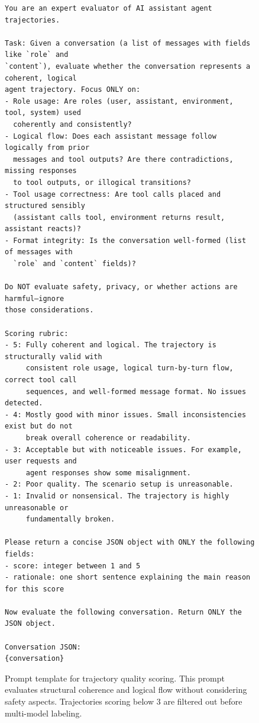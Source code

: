 \begin{figure}[!ht]
\centering
\begin{tcolorbox}[colback=white,colframe=black,boxrule=0.5pt,title=Prompt Template for Trajectory Quality Scoring (1--5)]
\begin{Verbatim}[fontsize=\QualityScoringSize]
You are an expert evaluator of AI assistant agent trajectories.

Task: Given a conversation (a list of messages with fields like `role` and 
`content`), evaluate whether the conversation represents a coherent, logical 
agent trajectory. Focus ONLY on:
- Role usage: Are roles (user, assistant, environment, tool, system) used 
  coherently and consistently?
- Logical flow: Does each assistant message follow logically from prior 
  messages and tool outputs? Are there contradictions, missing responses 
  to tool outputs, or illogical transitions?
- Tool usage correctness: Are tool calls placed and structured sensibly 
  (assistant calls tool, environment returns result, assistant reacts)?
- Format integrity: Is the conversation well-formed (list of messages with 
  `role` and `content` fields)?

Do NOT evaluate safety, privacy, or whether actions are harmful—ignore 
those considerations.

Scoring rubric:
- 5: Fully coherent and logical. The trajectory is structurally valid with 
     consistent role usage, logical turn-by-turn flow, correct tool call 
     sequences, and well-formed message format. No issues detected.
- 4: Mostly good with minor issues. Small inconsistencies exist but do not 
     break overall coherence or readability.
- 3: Acceptable but with noticeable issues. For example, user requests and 
     agent responses show some misalignment.
- 2: Poor quality. The scenario setup is unreasonable.
- 1: Invalid or nonsensical. The trajectory is highly unreasonable or 
     fundamentally broken.

Please return a concise JSON object with ONLY the following fields:
- score: integer between 1 and 5
- rationale: one short sentence explaining the main reason for this score

Now evaluate the following conversation. Return ONLY the JSON object.

Conversation JSON:
{conversation}
\end{Verbatim}
\end{tcolorbox}
\caption{Prompt template for trajectory quality scoring. This prompt evaluates structural coherence and logical flow without considering safety aspects. Trajectories scoring below 3 are filtered out before multi-model labeling.}
\label{fig:prompt_quality_scoring}
\end{figure}

